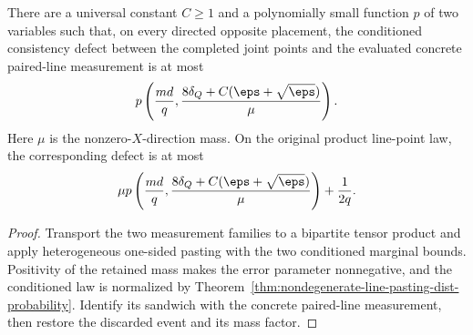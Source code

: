\begin{lemma}
	\label{lem:qld-paired-line-restored-defect}
	\leanok
	There are a universal constant $C\geq1$ and a polynomially small function
	$p$ of two variables such that, on every directed opposite placement, the
	conditioned consistency defect between the completed joint points and the
	evaluated concrete paired-line measurement is at most
	\[
		p\left(\frac{md}{q},
		\frac{8\delta_Q+C(\eps+\sqrt\eps)}{\mu}\right).
	\]
	Here $\mu$ is the nonzero-$X$-direction mass. On the original product
	line-point law, the corresponding defect is at most
	\[
		\mu p\left(\frac{md}{q},
		\frac{8\delta_Q+C(\eps+\sqrt\eps)}{\mu}\right)+\frac1{2q}.
	\]
\end{lemma}
\begin{proof}
	\leanok
	Transport the two measurement families to a bipartite tensor product and
	apply heterogeneous one-sided pasting with the two conditioned marginal
	bounds. Positivity of the retained mass makes the error parameter
	nonnegative, and the conditioned law is normalized by
	Theorem~\ref{thm:nondegenerate-line-pasting-dist-probability}.
	Identify its sandwich with the concrete paired-line measurement,
	then restore the discarded event and its mass factor.
\end{proof}

